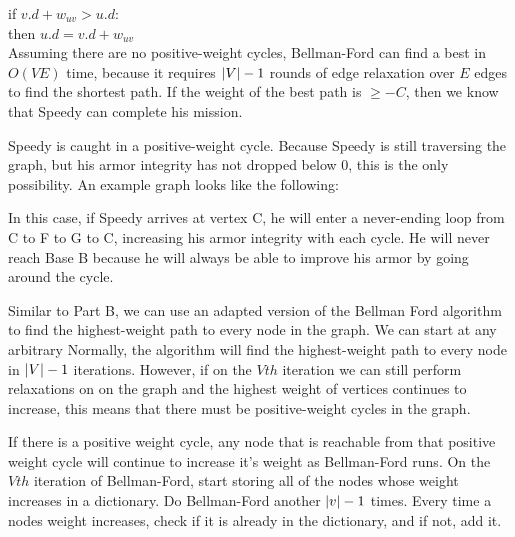 \documentclass[12pt,twoside]{article}
\begin{document}
\begin{problems}
\begin{problemparts}
if $v.d + w_{uv} > u.d$:\\
then $u.d = v.d + w_{uv}$\\

Assuming there are no positive-weight cycles, Bellman-Ford can find a best in $O(VE)$ time, because it requires $\left| V\right| - 1$ rounds of edge relaxation over $E$ edges to find the shortest path. If the weight of the best path is $\geq -C$, then we know that Speedy can complete his mission.

\problempart Speedy is caught in a positive-weight cycle. Because Speedy is still traversing the graph, but his armor integrity has not dropped below 0, this is the only possibility. An example graph looks like the following:


In this case, if Speedy arrives at vertex C, he will enter a never-ending loop from C to F to G to C, increasing his armor integrity with each cycle. He will never reach Base B because he will always be able to improve his armor by going around the cycle.

\problempart Similar to Part B, we can use an adapted version of the Bellman Ford algorithm to find the highest-weight path to every node in the graph. We can start at any arbitrary Normally, the algorithm will find the highest-weight path to every node in $\left| V\right|-1$ iterations. However, if on the $Vth$ iteration we can still perform relaxations on on the graph and the highest weight of vertices continues to increase, this means that there must be positive-weight cycles in the graph. 

If there is a positive weight cycle, any node that is reachable from that positive weight cycle will continue to increase it's weight as Bellman-Ford runs. On the $Vth$ iteration of Bellman-Ford, start storing all of the nodes whose weight increases in a dictionary. Do Bellman-Ford another $\left| v\right|-1$ times. Every time a nodes weight increases, check if it is already in the dictionary, and if not, add it.


\end{problemparts}
\end{problems}
\end{document}
